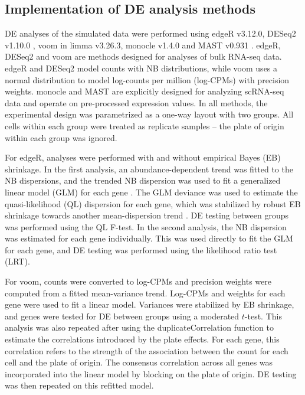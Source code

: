 \documentclass{article}
\begin{document}
\subsection{Implementation of DE analysis methods}
DE analyses of the simulated data were performed using edgeR v3.12.0, DESeq2 v1.10.0 \cite{love2014moderated}, voom \cite{law2014voom} in limma v3.26.3, 
    monocle v1.4.0 and MAST v0.931 \cite{finak2015mast}.
edgeR, DESeq2 and voom are methods designed for analyses of bulk RNA-seq data.
edgeR and DESeq2 model counts with NB distributions, while voom uses a normal distribution to model log-counts per million (log-CPMs) with precision weights.
monocle and MAST are explicitly designed for analyzing scRNA-seq data and operate on pre-processed expression values.
In all methods, the experimental design was parametrized as a one-way layout with two groups.
All cells within each group were treated as replicate samples -- the plate of origin within each group was ignored.

For edgeR, analyses were performed with and without empirical Bayes (EB) shrinkage.
In the first analysis, an abundance-dependent trend was fitted to the NB dispersions, 
    and the trended NB dispersion was used to fit a generalized linear model (GLM) for each gene \cite{mccarthy2012differential}.
The GLM deviance was used to estimate the quasi-likelihood (QL) dispersion for each gene, 
    which was stabilized by robust EB shrinkage towards another mean-dispersion trend \cite{lund2012detecting}.
DE testing between groups was performed using the QL F-test.
In the second analysis, the NB dispersion was estimated for each gene individually.
This was used directly to fit the GLM for each gene, and DE testing was performed using the likelihood ratio test (LRT).

For voom, counts were converted to log-CPMs and precision weights were computed from a fitted mean-variance trend.
Log-CPMs and weights for each gene were used to fit a linear model.
Variances were stabilized by EB shrinkage, and genes were tested for DE between groups using a moderated $t$-test.
This analysis was also repeated after using the duplicateCorrelation function to estimate the correlations introduced by the plate effects.
For each gene, this correlation refers to the strength of the association between the count for each cell and the plate of origin.
The consensus correlation across all genes was incorporated into the linear model by blocking on the plate of origin.
DE testing was then repeated on this refitted model.
\end{document}
